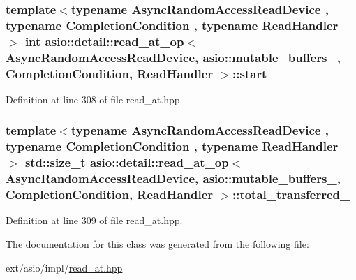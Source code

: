 \subsubsection[{start\+\_\+}]{\setlength{\rightskip}{0pt plus 5cm}template$<$typename Async\+Random\+Access\+Read\+Device , typename Completion\+Condition , typename Read\+Handler $>$ int {\bf asio\+::detail\+::read\+\_\+at\+\_\+op}$<$ Async\+Random\+Access\+Read\+Device,                           {\bf asio\+::mutable\+\_\+buffers\+\_}, Completion\+Condition, Read\+Handler $>$\+::start\+\_\+}\label{classasio_1_1detail_1_1read__at__op_3_01_async_random_access_read_device_00_01_01_01_01_01_01_01ccd5681b695707fee491134502088d0f_ae1d78219c7c76c7bca90c985c4a37128}


Definition at line 308 of file read\+\_\+at.\+hpp.

\hypertarget{classasio_1_1detail_1_1read__at__op_3_01_async_random_access_read_device_00_01_01_01_01_01_01_01ccd5681b695707fee491134502088d0f_a196b6aa951a048da2a0e73292dba5468}{}
\subsubsection[{total\+\_\+transferred\+\_\+}]{\setlength{\rightskip}{0pt plus 5cm}template$<$typename Async\+Random\+Access\+Read\+Device , typename Completion\+Condition , typename Read\+Handler $>$ std\+::size\+\_\+t {\bf asio\+::detail\+::read\+\_\+at\+\_\+op}$<$ Async\+Random\+Access\+Read\+Device,                           {\bf asio\+::mutable\+\_\+buffers\+\_}, Completion\+Condition, Read\+Handler $>$\+::total\+\_\+transferred\+\_\+}\label{classasio_1_1detail_1_1read__at__op_3_01_async_random_access_read_device_00_01_01_01_01_01_01_01ccd5681b695707fee491134502088d0f_a196b6aa951a048da2a0e73292dba5468}


Definition at line 309 of file read\+\_\+at.\+hpp.



The documentation for this class was generated from the following file\+:\begin{DoxyCompactItemize}
\item 
ext/asio/impl/\hyperlink{impl_2read__at_8hpp}{read\+\_\+at.\+hpp}\end{DoxyCompactItemize}

